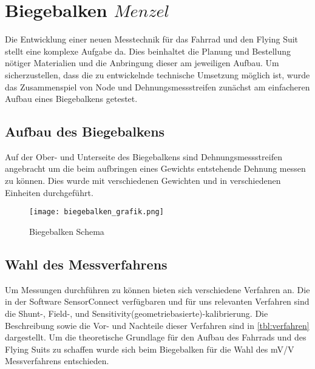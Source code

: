 \section{Biegebalken \(Menzel\)}
Die Entwicklung einer neuen Messtechnik für das Fahrrad und den Flying Suit stellt eine komplexe Aufgabe da.
Dies beinhaltet die Planung und Bestellung nötiger Materialien und die Anbringung dieser am jeweiligen Aufbau.
Um sicherzustellen, dass die zu entwickelnde technische Umsetzung möglich ist, wurde das Zusammenspiel von Node und Dehnungsmessstreifen zunächst am einfacheren Aufbau eines Biegebalkens getestet.


\subsection{Aufbau des Biegebalkens}
Auf der Ober- und Unterseite des Biegebalkens sind Dehnungsmessstreifen angebracht um die beim aufbringen eines Gewichts entstehende Dehnung messen zu können.
Dies wurde mit verschiedenen Gewichten und in verschiedenen Einheiten durchgeführt.
\begin{figure}[h]
    \begin{center}
        \texttt{[image: biegebalken\_grafik.png]}
        \caption[Biegebalken Schema (Abbildungsverzeichnis)]{Biegebalken Schema
        }
        \label{fig:biegebalkenschema}
    \end{center}
\end{figure}

\subsection{Wahl des Messverfahrens}
Um Messungen durchführen zu können bieten sich verschiedene Verfahren an.
Die in der Software SensorConnect verfügbaren und für uns relevanten Verfahren sind die Shunt-, Field-, und Sensitivity(geometriebasierte)-kalibrierung.
Die Beschreibung sowie die Vor- und Nachteile dieser Verfahren sind in \ref{tbl:verfahren}  dargestellt.
Um die theoretische Grundlage für den Aufbau des Fahrrads und des Flying Suits zu schaffen wurde sich beim Biegebalken für die Wahl des mV/V Messverfahrens entschieden.

